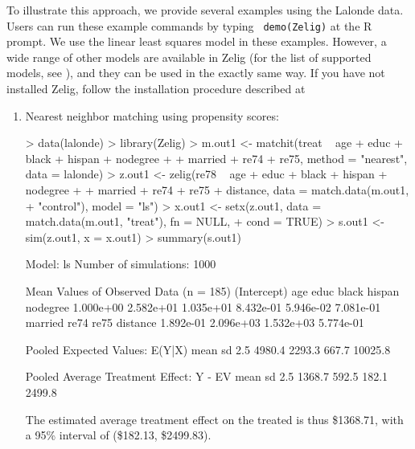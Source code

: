 To illustrate this approach, we provide several examples using the
Lalonde data. Users can run these example commands by typing {\tt
  demo(Zelig)} at the R prompt. We use the linear least squares model
in these examples. However, a wide range of other models are available
in Zelig (for the list of supported models, see
),
and they can be used in the exactly same way. If you have not
installed Zelig, follow the installation procedure described at

\begin{enumerate}
\item Nearest neighbor matching using propensity scores: 

\begin{Schunk}
\begin{Sinput}
> data(lalonde)
> library(Zelig)
> m.out1 <- matchit(treat ~ age + educ + black + hispan + nodegree + 
+     married + re74 + re75, method = "nearest", data = lalonde)
> z.out1 <- zelig(re78 ~ age + educ + black + hispan + nodegree + 
+     married + re74 + re75 + distance, data = match.data(m.out1, 
+     "control"), model = "ls")
> x.out1 <- setx(z.out1, data = match.data(m.out1, "treat"), fn = NULL, 
+     cond = TRUE)
> s.out1 <- sim(z.out1, x = x.out1)
> summary(s.out1)
\end{Sinput}
\begin{Soutput}

  Model: ls 
  Number of simulations: 1000 

Mean Values of Observed Data (n = 185) 
(Intercept)         age        educ       black      hispan    nodegree 
  1.000e+00   2.582e+01   1.035e+01   8.432e-01   5.946e-02   7.081e-01 
    married        re74        re75    distance 
  1.892e-01   2.096e+03   1.532e+03   5.774e-01 

Pooled Expected Values: E(Y|X)
   mean      sd    2.5%   97.5% 
 4980.4  2293.3   667.7 10025.8 

Pooled Average Treatment Effect: Y - EV
  mean     sd   2.5%  97.5% 
1368.7  592.5  182.1 2499.8 

\end{Soutput}
\end{Schunk}
  
The estimated average treatment effect on the treated is thus 
\$1368.71, 
with a 95\% interval
of (\$182.13, 
\$2499.83).


\end{enumerate}
